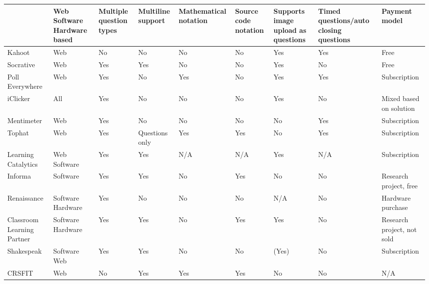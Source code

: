 \begin{landscape}
\thispagestyle{empty}
    \begin{center}
        \begin{table}[H]
            \begin{tabularx}{\paperwidth}{ |X|X|X|X|X|X|X|X|X| } 
             \hline
                 & Web \newline Software \newline Hardware based & Multiple question types & Multiline support & Mathematical notation & Source code notation & Supports image upload as questions & Timed questions/auto closing questions & Payment model \\ \hline
                 
              Kahoot                & Web   & No    & No    & \cellcolor{red!25}No    & \cellcolor{red!25}No    & Yes   & Yes   & Free \\ \hline
              Socrative             & Web   & Yes   & Yes   & \cellcolor{red!25}No    & \cellcolor{red!25}No    & Yes   & No    & Free \\ \hline
              Poll Everywhere       & Web   & Yes   & No    & \cellcolor{green!25}Yes   & \cellcolor{red!25}No    & Yes   & Yes   & Subscription \\ \hline
              iClicker              & All   & Yes   & No    & \cellcolor{red!25}No    & \cellcolor{red!25}No    & Yes   & No    & Mixed based on solution \\ \hline
              Mentimeter            & Web   & Yes & No   & \cellcolor{red!25}No    & \cellcolor{red!25}No    & No    & Yes   & Subscription \\ \hline
              Tophat                & Web   & Yes & Questions only & \cellcolor{green!25}Yes & \cellcolor{green!25}Yes   & No    & Yes & Subscription \\ \hline
              Learning Catalytics   & Web \newline Software   & Yes    & Yes  & N/A   & N/A   & Yes   & N/A   & Subscription \\ \hline
              Informa        & Software & Yes & Yes  & \cellcolor{red!25}No & \cellcolor{green!25}Yes   & No    & No    & Research project, free \\ \hline
              Renaissance           & Software \newline Hardware & Yes & No & \cellcolor{red!25} No & \cellcolor{red!25}No & N/A & No & Hardware purchase \\ \hline
              Classroom Learning Partner & Software \newline Hardware & Yes & Yes & \cellcolor{red!25}No & \cellcolor{green!25}Yes & Yes & No & Research project, not sold \\ \hline
              Shakespeak            & Software \newline Web & Yes & Yes & \cellcolor{red!25}No & \cellcolor{red!25}No & (Yes) & No & Subscription \\ \Xhline{2\arrayrulewidth}
              CRSFIT                & Web & No & Yes & \cellcolor{green!25}Yes & \cellcolor{green!25}Yes & No & No & N/A \\ \hline
            

\end{tabularx}
\end{table}
\end{center}
\end{landscape}
